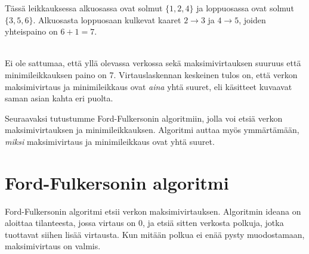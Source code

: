 \begin{center}
\end{center}

Tässä leikkauksessa alkuosassa ovat solmut $\{1,2,4\}$
ja loppuosassa ovat solmut $\{3,5,6\}$.
Alkuosasta loppuosaan kulkevat
kaaret $2 \rightarrow 3$ ja $4 \rightarrow 5$,
joiden yhteispaino on $6+1=7$.

~\\
\noindent
Ei ole sattumaa, että yllä olevassa verkossa
sekä maksimivirtauksen suuruus
että minimileikkauksen paino on 7.
Virtauslaskennan keskeinen tulos on,
että verkon maksimivirtaus ja
minimileikkaus
ovat \textit{aina} yhtä suuret,
eli käsitteet kuvaavat saman asian
kahta eri puolta.

Seuraavaksi tutustumme Ford-Fulkersonin
algoritmiin, jolla voi etsiä verkon
maksimivirtauksen ja
minimileikkauksen.
Algoritmi auttaa myös ymmärtämään,
\textit{miksi} maksimivirtaus ja
minimileikkaus ovat yhtä suuret.

\section{Ford-Fulkersonin algoritmi}

Ford-Fulkersonin algoritmi etsii verkon maksimivirtauksen.
Algoritmin ideana on aloittaa tilanteesta,
jossa virtaus on 0, ja etsiä sitten verkosta polkuja,
jotka tuottavat siihen lisää virtausta.
Kun mitään polkua ei enää pysty muodostamaan,
maksimivirtaus on valmis.

